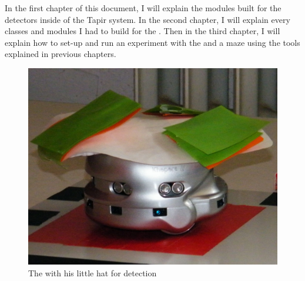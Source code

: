 In the first chapter of this document, I will explain the modules built 
for the detectors inside of the Tapir system. In the second chapter, 
I will explain every classes and modules I had to build for the \clsquare{}. 
Then in the third chapter, I will explain how to set-up and run an 
experiment with the \khepera{} and a maze using the tools explained 
in previous chapters. 

\begin{figure}
    \begin{center}
        \includegraphics[width=\textwidth]{./img/kheperacrop.png}
        \caption[The \khepera{}]{%
        The \khepera{} with his little hat for detection}
    \end{center}
\end{figure}
